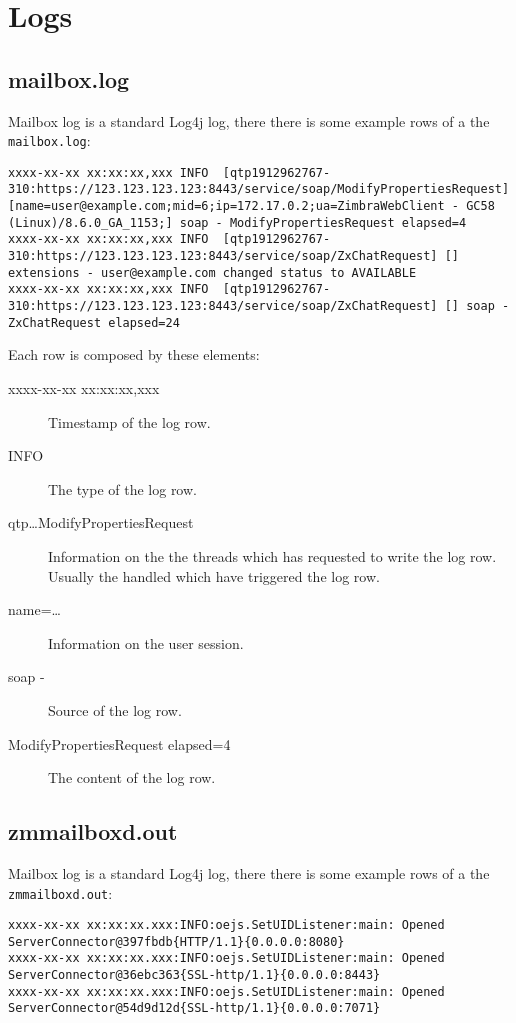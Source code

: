 \section{Logs}
\label{==sect:logs==}

\subsection{mailbox.log}
\label{==sect:mailboxlog==}

    Mailbox log is a standard Log4j log, there there is some example rows of a the \verb+mailbox.log+:
    \begin{lstlisting}[breaklines]
xxxx-xx-xx xx:xx:xx,xxx INFO  [qtp1912962767-310:https://123.123.123.123:8443/service/soap/ModifyPropertiesRequest] [name=user@example.com;mid=6;ip=172.17.0.2;ua=ZimbraWebClient - GC58 (Linux)/8.6.0_GA_1153;] soap - ModifyPropertiesRequest elapsed=4
xxxx-xx-xx xx:xx:xx,xxx INFO  [qtp1912962767-310:https://123.123.123.123:8443/service/soap/ZxChatRequest] [] extensions - user@example.com changed status to AVAILABLE
xxxx-xx-xx xx:xx:xx,xxx INFO  [qtp1912962767-310:https://123.123.123.123:8443/service/soap/ZxChatRequest] [] soap - ZxChatRequest elapsed=24
    \end{lstlisting}
    Each row is composed by these elements:
    \begin{description}
        \item [xxxx-xx-xx xx:xx:xx,xxx] Timestamp of the log row.
        \item [INFO] The type of the log row.
        \item [qtp\ldots{}ModifyPropertiesRequest] Information on the the threads which has requested to write the log row.
            Usually the handled which have triggered the log row.
        \item [name=\ldots{}] Information
            on the user session.
        \item [soap -] Source of the log row.
        \item [ModifyPropertiesRequest elapsed=4] The content of the log row.
    \end{description}

\subsection{zmmailboxd.out}
\label{==sect:zmmailboxdout==}

    Mailbox log is a standard Log4j log, there there is some example rows of a the \verb+zmmailboxd.out+:
    \begin{lstlisting}[breaklines]
xxxx-xx-xx xx:xx:xx.xxx:INFO:oejs.SetUIDListener:main: Opened ServerConnector@397fbdb{HTTP/1.1}{0.0.0.0:8080}
xxxx-xx-xx xx:xx:xx.xxx:INFO:oejs.SetUIDListener:main: Opened ServerConnector@36ebc363{SSL-http/1.1}{0.0.0.0:8443}
xxxx-xx-xx xx:xx:xx.xxx:INFO:oejs.SetUIDListener:main: Opened ServerConnector@54d9d12d{SSL-http/1.1}{0.0.0.0:7071}
    \end{lstlisting}
